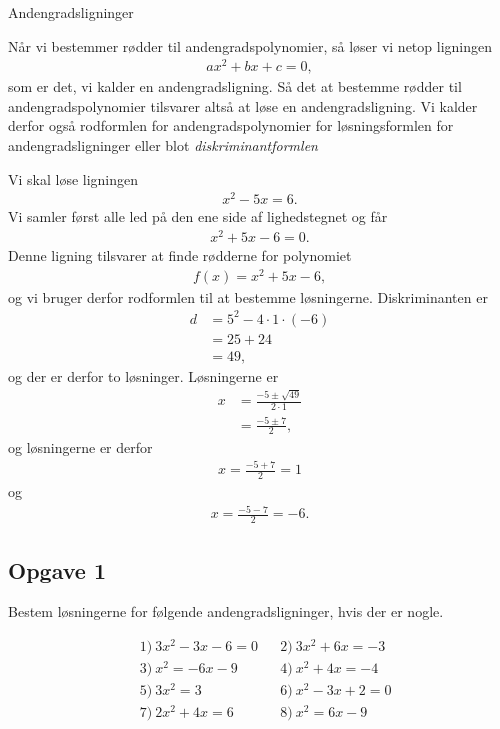 
\begin{center}
\Huge
Andengradsligninger
\end{center}
Når vi bestemmer rødder til andengradspolynomier, så løser vi netop ligningen 
\begin{align*}
	ax^2 + bx + c = 0,
\end{align*}
som er det, vi kalder en andengradsligning. Så det at bestemme rødder til andengradspolynomier
tilsvarer altså at løse en andengradsligning. Vi kalder derfor også rodformlen for andengradspolynomier for løsningsformlen for andengradsligninger eller blot \textit{diskriminantformlen}

\begin{exa}
	Vi skal løse ligningen 
	\begin{align*}
		x^2-5x = 6.
	\end{align*}
	Vi samler først alle led på den ene side af lighedstegnet og får
	\begin{align*}
		x^2 + 5x - 6 = 0.
	\end{align*}
	Denne ligning tilsvarer at finde rødderne for polynomiet
	\begin{align*}
		f(x) = x^2 + 5x - 6,
	\end{align*}
	og vi bruger derfor rodformlen til at bestemme løsningerne.
	Diskriminanten er
	\begin{align*}
		d &= 5^2 - 4 \cdot 1 \cdot (-6) \\
		  &= 25 + 24 \\
		  &= 49,
	\end{align*}
	og der er derfor to løsninger. Løsningerne er
	\begin{align*}
		x &= \frac{-5 \pm \sqrt{49}}{2\cdot 1} \\
		 &= \frac{-5 \pm 7}{2},
	\end{align*}
	og løsningerne er derfor 
	\begin{align*}
		x = \frac{-5 + 7}{2} = 1
	\end{align*}
	og
	\begin{align*}
		x = \frac{-5 -7}{2} = -6.
	\end{align*}
\end{exa}

\subsection*{Opgave 1}
Bestem løsningerne for følgende andengradsligninger, hvis der er nogle. 

\begin{align*}
	&1) \ 3 x^2 - 3 x - 6 = 0  &&2) \ 3 x^2 + 6 x  = -3   \\
	&3) \ x^2 = -6 x -9 &&4) \ x^2 + 4x = -4   \\
	&5) \ 3x^2 = 3        &&6) \ x^2-3x+2 = 0 \\
    &7) \ 2x^2+4x = 6    &&8) \ x^2 = 6 x - 9   \\
\end{align*}
